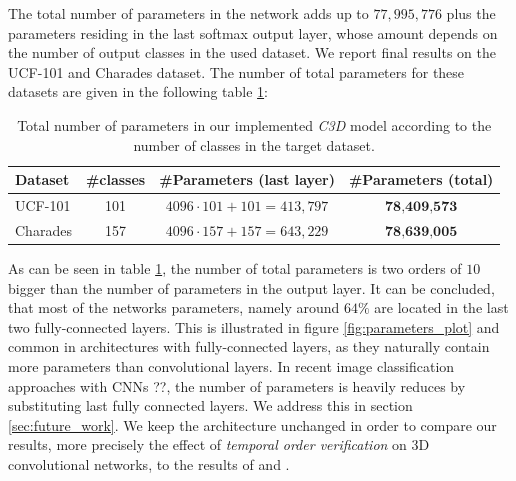 The total number of parameters in the network adds up to $77,995,776$ plus the parameters residing in the last softmax output layer, whose amount depends on the number of output classes in the used dataset.
We report final results on the UCF-101 and Charades dataset.
The number of total parameters for these datasets are given in the following table \ref{tab:parameters_per_dataset}:
\begin{table}[H]
    \centering
    \begin{tabularx}{\textwidth}{l c c c} 
            Dataset & \#classes & \#Parameters (last layer) & \#Parameters (total) \\ 
            \hline
            UCF-101 & 101 & \hspace{0.5cm} $4096 \cdot 101 + 101 = 413,797$ \hspace{0.5cm} & $\textbf{78,409,573}$ \\
            Charades & 157 & $4096 \cdot 157 + 157 = 643,229$ & $\textbf{78,639,005}$ \\
    \end{tabularx}
    \caption{Total number of parameters in our implemented \textit{C3D} model according to the number of classes in the target dataset.}
    \label{tab:parameters_per_dataset}
\end{table}

As can be seen in table \ref{tab:parameters_per_dataset}, the number of total parameters is two orders of $10$ bigger than the number of parameters in the output layer.
It can be concluded, that most of the networks parameters, namely around $64\%$ are located in the last two fully-connected layers.
This is illustrated in figure \ref{fig:parameters_plot} and common in architectures with fully-connected layers, as they naturally contain more parameters than convolutional layers.
In recent image classification approaches with CNNs ??, the number of parameters is heavily reduces by substituting last fully connected layers.
We address this in section \ref{sec:future_work}.
We keep the architecture unchanged in order to compare our results, more precisely the effect of \textit{temporal order verification} on 3D convolutional networks, to the results of \textcite{tran_learning_2015} and \textcite{carreira_quo_2017}.

